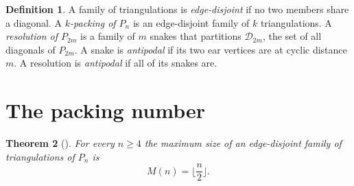 \documentclass[11pt,a4paper]{article}
\newtheorem{theorem}{Theorem}[section]
\theoremstyle{definition}
\newtheorem{definition}[theorem]{Definition}
\theoremstyle{remark}
\newcommand{\diags}{\ensuremath{\mathcal{D}}}
\begin{document}
\begin{definition}
A family of triangulations is \emph{edge-disjoint} if no two members share a diagonal.
A \emph{$k$-packing of $P_n$} is an edge-disjoint family of $k$ triangulations.
A \emph{resolution of $P_{2m}$} is a family of $m$ snakes that partitions $\diags_{2m}$, the set
of all diagonals of $P_{2m}$.  A snake is \emph{antipodal} if its two ear vertices are at
cyclic distance $m$.  A resolution is \emph{antipodal} if all of its snakes are.
\end{definition}

\section{The packing number}

\begin{theorem}[\label{thm:packing-number}]
For every $n\ge4$ the maximum size of an edge-disjoint family of triangulations of $P_n$
is
\[
  M(n)=\Big\lfloor\frac n2\Big\rfloor .
\]
\end{theorem}
\end{document}
